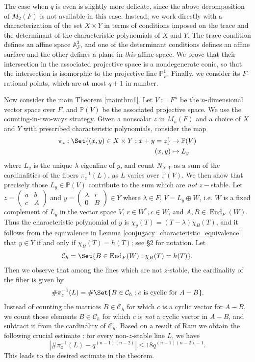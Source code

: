 \documentclass[preprint,11pt]{amsart}
\def\A{\mathbb{A}}
\def\P{\mathbb{P}}
\newcommand{\CalC}{\mathcal{C}}
\theoremstyle{definition}
\numberwithin{thm}{section}
\newcommand{\End}{\operatorname{End}}
\newcommand{\abs}[1]{\left| #1 \right|}
\newcommand{\tit}[1]{\textit{#1}}
\newcommand{\trm}[1]{\textrm{#1}}
\newcommand{\lam}{\lambda}
\begin{document}
The case when $q$ is even is slightly more delicate, since the above decomposition of $M_2(F)$ is not available in this case. Instead, we work directly with a  characterization of the set $X \times Y$ in terms of conditions imposed on the trace and the determinant of the characteristic polynomials of $X$ and $Y$. The trace condition defines an affine space $\A_{F}^3$, and one of the determinant conditions defines an affine surface  and the other defines a plane in \tit{this} affine space. We prove that their intersection in the associated projective space  is a nondegenerate conic, so that the intersection is isomorphic to the projective line $\P^1_{\overline{F}}$. Finally, we consider its $F$-rational points, which are at most $q+1$ in number.



Now consider the main Theorem \ref{mainthm1}. Let $V := F^n$ be the $n$-dimensional vector space over $F$, and $\P(V)$ be the associated projective space. We use the counting-in-two-ways strategy. Given a nonscalar $z$ in $M_n(F)$ and a choice of $X$ and $Y$ with prescribed characteristic polynomials, consider the map 
\begin{align*} \pi_z : \Set{ (x,y) \in X \times Y : x + y  =z} &\to \P(V) \\
(x,y) &\mapsto L_y
\end{align*}
where $L_y$ is the unique $\lambda$-eigenline of $y$, and count $N_{X, Y}$ as a sum of the cardinalities of the fibers $\pi_z^{-1}(L)$, as $L$ varies over $\P(V)$. We then show that precisely those $L_y \in \P(V)$ contribute to the sum which are \tit{not} $z-$stable. Let $z = \begin{pmatrix} a & b \\ c & A \end{pmatrix}$ and $y = \begin{pmatrix} \lambda & r \\ 0 & B \end{pmatrix} \in Y$ where $\lambda \in F$, $V = L_y \oplus W$, i.e. $W$ is a fixed complement of $L_y$ in the vector space $V$, $r \in W^*, c \in W$, and $A, B \in \End_{F}(W)$. Thus the characteristic polynomial of $y$ is $\chi_y(T) =(T- \lam) \chi_B(T)$, and it follows from the equivalence in Lemma \ref{conjugacy_characteristic_equivalence} that $y \in Y$ if and only if $\chi_B(T) = h(T)$; see \S 2 for notation. Let 
$$
\CalC_h = \Set{B \in \End_{F}(W) : \chi_B(T) = h(T)}.
$$
Then we observe that among the lines which are not $z$-stable, the cardinality of the fiber is given by
$$
\#\pi_z^{-1}(L) = \# \Set{B \in \CalC_h : c \trm{ is cyclic for } A - B}.
$$
Instead of counting the matrices $B \in \CalC_h$ for which $c$ is a cyclic vector for $A- B$, we count those elements $B \in \CalC_h$ for which $c$ is \tit{not} a cyclic vector in $A- B$, and subtract it from the cardinality of $\CalC_h$. Based on a result of Ram \cite{Ra} we  obtain the following crucial estimate
: for every non-$z$-stable line $L$, we have
$$
\abs{\# \pi_z^{-1}(L)  - q^{(n-1)(n-2)}} \leq 18q^{(n-1)(n-2) -1}.
$$
This leads to the desired estimate in the theorem. 
\end{document}
